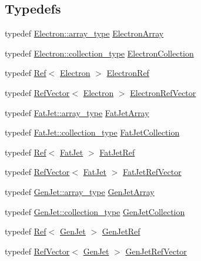 \subsection*{Typedefs}
\begin{DoxyCompactItemize}
\item 
typedef \hyperlink{classpanda_1_1Array}{Electron::array\_\-type} \hyperlink{namespacepanda_a0cc09e44a594f5e3484863e0cabcf1d2}{ElectronArray}
\item 
typedef \hyperlink{classpanda_1_1Collection}{Electron::collection\_\-type} \hyperlink{namespacepanda_ae08c35528aface79eb4f0671ae514fe2}{ElectronCollection}
\item 
typedef \hyperlink{classpanda_1_1Ref}{Ref}$<$ \hyperlink{classpanda_1_1Electron}{Electron} $>$ \hyperlink{namespacepanda_a0c21bff4783a1d39ba9c58e66d65f77d}{ElectronRef}
\item 
typedef \hyperlink{classpanda_1_1RefVector}{RefVector}$<$ \hyperlink{classpanda_1_1Electron}{Electron} $>$ \hyperlink{namespacepanda_a4e1055d408d62ead8d90dde25b4a41d2}{ElectronRefVector}
\item 
typedef \hyperlink{classpanda_1_1Array}{FatJet::array\_\-type} \hyperlink{namespacepanda_a78151d325b1db9db73a5d43336ec3da8}{FatJetArray}
\item 
typedef \hyperlink{classpanda_1_1Collection}{FatJet::collection\_\-type} \hyperlink{namespacepanda_af6604b483c9123e1f5b9a805dc8da416}{FatJetCollection}
\item 
typedef \hyperlink{classpanda_1_1Ref}{Ref}$<$ \hyperlink{classpanda_1_1FatJet}{FatJet} $>$ \hyperlink{namespacepanda_a6cabf29d23a5c0dcf9e98615c69bc34a}{FatJetRef}
\item 
typedef \hyperlink{classpanda_1_1RefVector}{RefVector}$<$ \hyperlink{classpanda_1_1FatJet}{FatJet} $>$ \hyperlink{namespacepanda_af3f9c44a78fa4a19b1ed37737dbefeae}{FatJetRefVector}
\item 
typedef \hyperlink{classpanda_1_1Array}{GenJet::array\_\-type} \hyperlink{namespacepanda_a3f721db724bab72328c7c0e7dbf52b14}{GenJetArray}
\item 
typedef \hyperlink{classpanda_1_1Collection}{GenJet::collection\_\-type} \hyperlink{namespacepanda_a35dec08f9805131c733e00465133b558}{GenJetCollection}
\item 
typedef \hyperlink{classpanda_1_1Ref}{Ref}$<$ \hyperlink{classpanda_1_1GenJet}{GenJet} $>$ \hyperlink{namespacepanda_a0b877f84d6324c2cd1b857eaeef95e8b}{GenJetRef}
\item 
typedef \hyperlink{classpanda_1_1RefVector}{RefVector}$<$ \hyperlink{classpanda_1_1GenJet}{GenJet} $>$ \hyperlink{namespacepanda_a09ed2c0da40890206cb40eb12d78df66}{GenJetRefVector}

\end{DoxyCompactItemize}
